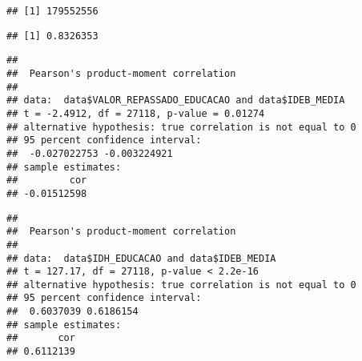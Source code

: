 \documentclass[
]{article}
\newenvironment{Shaded}{\begin{snugshade}}{\end{snugshade}}
\newcommand{\CommentTok}[1]{\textcolor[rgb]{0.56,0.35,0.01}{\textit{#1}}}
\newcommand{\DataTypeTok}[1]{\textcolor[rgb]{0.13,0.29,0.53}{#1}}
\newcommand{\KeywordTok}[1]{\textcolor[rgb]{0.13,0.29,0.53}{\textbf{#1}}}
\newcommand{\NormalTok}[1]{#1}
\newcommand{\OperatorTok}[1]{\textcolor[rgb]{0.81,0.36,0.00}{\textbf{#1}}}
\newcommand{\StringTok}[1]{\textcolor[rgb]{0.31,0.60,0.02}{#1}}
\begin{document}
\begin{verbatim}
## [1] 179552556
\end{verbatim}

\begin{Shaded}
\end{Shaded}

\begin{verbatim}
## [1] 0.8326353
\end{verbatim}

\begin{Shaded}
\end{Shaded}

\begin{verbatim}
## 
##  Pearson's product-moment correlation
## 
## data:  data$VALOR_REPASSADO_EDUCACAO and data$IDEB_MEDIA
## t = -2.4912, df = 27118, p-value = 0.01274
## alternative hypothesis: true correlation is not equal to 0
## 95 percent confidence interval:
##  -0.027022753 -0.003224921
## sample estimates:
##         cor 
## -0.01512598
\end{verbatim}

\begin{Shaded}
\end{Shaded}

\begin{verbatim}
## 
##  Pearson's product-moment correlation
## 
## data:  data$IDH_EDUCACAO and data$IDEB_MEDIA
## t = 127.17, df = 27118, p-value < 2.2e-16
## alternative hypothesis: true correlation is not equal to 0
## 95 percent confidence interval:
##  0.6037039 0.6186154
## sample estimates:
##       cor 
## 0.6112139
\end{verbatim}

\begin{Shaded}
\end{Shaded}
\end{document}
